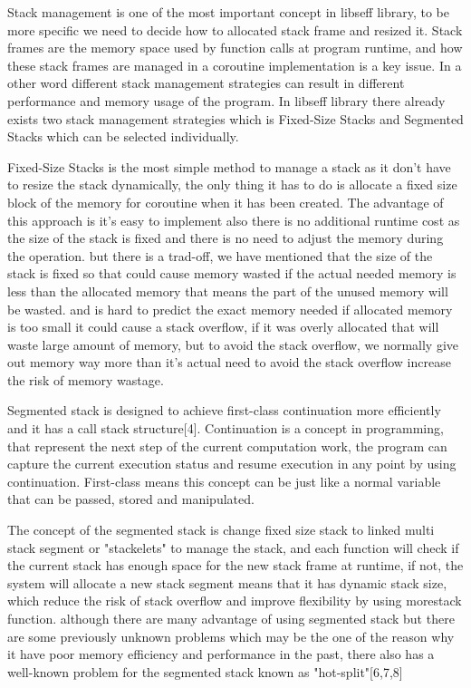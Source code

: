 \documentclass{article}
\begin{document}
\medskip
\medskip

Stack management is one of the most important concept in libseff  library, to be more specific we need to decide how to allocated stack frame and resized it. Stack frames are the memory space used by function calls at program runtime, and how these stack frames are managed in a coroutine implementation is a key issue. In a other word different stack management strategies can result in different performance and memory usage of the program. In libseff library there already exists two stack management strategies which is Fixed-Size Stacks and Segmented Stacks which can be selected individually.

\medskip

Fixed-Size Stacks is the most simple method to manage a stack as it don't have to resize the stack dynamically, the only thing it has to do is allocate a fixed size block of the memory for coroutine when it has been created. The advantage of this approach is it's easy to implement also there is no additional runtime cost as the size of the stack is fixed and there is no need to adjust the memory during the operation. but there is a trad-off, we have mentioned that the size of the stack is fixed so that could cause memory wasted if the actual needed memory is less than the allocated memory that means the part of the unused memory will be wasted. and is hard to predict the exact memory needed if allocated memory is too small it could cause a stack overflow, if it was overly allocated that will waste large amount of memory, but to avoid the stack overflow, we normally give out memory way more than it's actual need to avoid the stack overflow increase the risk of memory wastage.

\medskip

Segmented stack is designed to achieve first-class continuation more efficiently and it has a call stack structure[4]. Continuation is a concept in programming, that represent the next step of the current computation work, the program can capture the current execution status and resume execution in any point by using continuation. First-class means this concept can be just like a normal variable that can be passed, stored and manipulated. 

\medskip


The concept of the segmented stack is change fixed size stack to linked multi stack segment or "stackelets" to manage the stack, and each function will check if the current stack has enough space for the new stack frame at runtime, if not, the system will allocate a new stack segment means that it has dynamic stack size, which reduce the risk of stack overflow and improve flexibility by using morestack function. although there are many advantage of using segmented stack but there are some previously unknown problems which may be the one of the reason why it have poor memory efficiency and performance in the past, there also has a well-known problem for the segmented stack known as "hot-split"[6,7,8]
\end{document}
